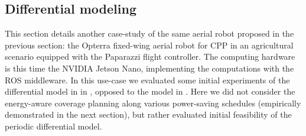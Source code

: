 \subsection{Differential modeling}
\label{sec:res-diff}

This section details another case-study of the same aerial robot proposed in the previous section: the Opterra fixed-wing aerial robot for CPP in an agricultural scenario equipped with the Paparazzi flight controller. The computing hardware is this time the NVIDIA Jetson Nano, implementing the computations with the ROS middleware. In this use-case we evaluated some initial experiments of the differential model in  in , opposed to the model in . Here we did not consider the energy-aware coverage planning along various power-saving schedules (empirically demonstrated in the next section), but rather evaluated initial feasibility of the periodic differential model.  


